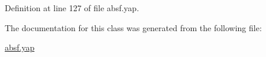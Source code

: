 Definition at line 127 of file absf.\+yap.



The documentation for this class was generated from the following file\+:\begin{DoxyCompactItemize}
\item 
\hyperlink{absf_8yap}{absf.\+yap}\end{DoxyCompactItemize}
